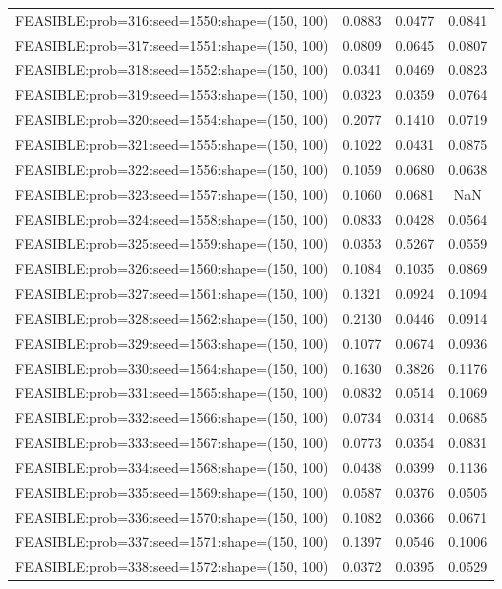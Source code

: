 \begin{longtable}{lccc}
FEASIBLE:prob=316:seed=1550:shape=(150, 100) & 0.0883 & 0.0477 & 0.0841 \\
FEASIBLE:prob=317:seed=1551:shape=(150, 100) & 0.0809 & 0.0645 & 0.0807 \\
FEASIBLE:prob=318:seed=1552:shape=(150, 100) & 0.0341 & 0.0469 & 0.0823 \\
FEASIBLE:prob=319:seed=1553:shape=(150, 100) & 0.0323 & 0.0359 & 0.0764 \\
FEASIBLE:prob=320:seed=1554:shape=(150, 100) & 0.2077 & 0.1410 & 0.0719 \\
FEASIBLE:prob=321:seed=1555:shape=(150, 100) & 0.1022 & 0.0431 & 0.0875 \\
FEASIBLE:prob=322:seed=1556:shape=(150, 100) & 0.1059 & 0.0680 & 0.0638 \\
FEASIBLE:prob=323:seed=1557:shape=(150, 100) & 0.1060 & 0.0681 &    NaN \\
FEASIBLE:prob=324:seed=1558:shape=(150, 100) & 0.0833 & 0.0428 & 0.0564 \\
FEASIBLE:prob=325:seed=1559:shape=(150, 100) & 0.0353 & 0.5267 & 0.0559 \\
FEASIBLE:prob=326:seed=1560:shape=(150, 100) & 0.1084 & 0.1035 & 0.0869 \\
FEASIBLE:prob=327:seed=1561:shape=(150, 100) & 0.1321 & 0.0924 & 0.1094 \\
FEASIBLE:prob=328:seed=1562:shape=(150, 100) & 0.2130 & 0.0446 & 0.0914 \\
FEASIBLE:prob=329:seed=1563:shape=(150, 100) & 0.1077 & 0.0674 & 0.0936 \\
FEASIBLE:prob=330:seed=1564:shape=(150, 100) & 0.1630 & 0.3826 & 0.1176 \\
FEASIBLE:prob=331:seed=1565:shape=(150, 100) & 0.0832 & 0.0514 & 0.1069 \\
FEASIBLE:prob=332:seed=1566:shape=(150, 100) & 0.0734 & 0.0314 & 0.0685 \\
FEASIBLE:prob=333:seed=1567:shape=(150, 100) & 0.0773 & 0.0354 & 0.0831 \\
FEASIBLE:prob=334:seed=1568:shape=(150, 100) & 0.0438 & 0.0399 & 0.1136 \\
FEASIBLE:prob=335:seed=1569:shape=(150, 100) & 0.0587 & 0.0376 & 0.0505 \\
FEASIBLE:prob=336:seed=1570:shape=(150, 100) & 0.1082 & 0.0366 & 0.0671 \\
FEASIBLE:prob=337:seed=1571:shape=(150, 100) & 0.1397 & 0.0546 & 0.1006 \\
FEASIBLE:prob=338:seed=1572:shape=(150, 100) & 0.0372 & 0.0395 & 0.0529 \\

\end{longtable}
